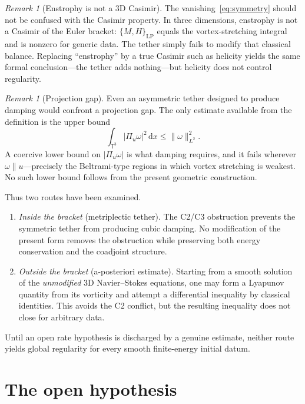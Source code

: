 \documentclass[11pt,reqno]{amsart}
\theoremstyle{plain}
\theoremstyle{definition}
\theoremstyle{remark}
\newtheorem{remark}[theorem]{Remark}
\newcommand{\TT}{\mathbb{T}}
\newcommand{\Lean}[1]{\texttt{\detokenize{#1}}}
\newcommand{\dd}{\mathrm{d}}
\begin{document}
\begin{remark}[Enstrophy is not a 3D Casimir]\label{rem:not-casimir}
The vanishing~\eqref{eq:symmetry} should not be confused with the Casimir
property. In three dimensions, enstrophy is not a Casimir of the Euler
bracket: $\{M,H\}_{\mathrm{LP}}$ equals the vortex-stretching integral and is
nonzero for generic data. The tether simply fails to modify that classical
balance. Replacing ``enstrophy'' by a true Casimir such as helicity yields the
same formal conclusion---the tether adds nothing---but helicity does not
control regularity.
\end{remark}

\begin{remark}[Projection gap]\label{rem:projection-gap}
Even an asymmetric tether designed to produce damping would confront a
projection gap. The only estimate available from the definition is the upper
bound
\[
  \int_{\TT^3}|\Pi_u\omega|^2\,\dd x\le\|\omega\|_{L^2}^2.
\]
A coercive lower bound on $|\Pi_u\omega|$ is what damping requires, and it
fails wherever $\omega\parallel u$---precisely the Beltrami-type regions in which
vortex stretching is weakest. No such lower bound follows from the present
geometric construction.
\end{remark}

Thus two routes have been examined.
\begin{enumerate}[leftmargin=1.5em]
  \item \emph{Inside the bracket} (metriplectic tether). The C2/C3 obstruction
    prevents the symmetric tether from producing cubic damping. No modification
    of the present form removes the obstruction while preserving both energy
    conservation and the coadjoint structure.
  \item \emph{Outside the bracket} (a-posteriori estimate). Starting from a
    smooth solution of the \emph{unmodified} 3D Navier--Stokes equations, one
    may form a Lyapunov quantity from its vorticity and attempt a differential
    inequality by classical identities. This avoids the C2 conflict, but the
    resulting inequality does not close for arbitrary data.
\end{enumerate}
Until an open rate hypothesis is discharged by a genuine estimate, neither
route yields global regularity for every smooth finite-energy initial datum.

\section{The open hypothesis \texorpdfstring{\Lean{FrohmanianTetherRate}}{FrohmanianTetherRate}}\label{sec:rate}
\end{document}
